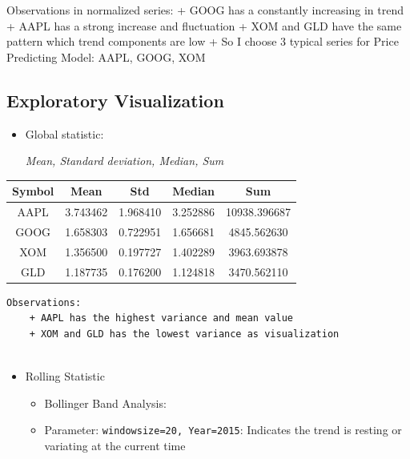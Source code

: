 \documentclass[11pt]{article}
\providecommand{\tightlist}{%
      \setlength{\itemsep}{0pt}\setlength{\parskip}{0pt}}
\begin{document}
Observations in normalized series: + GOOG has a constantly increasing in
trend + AAPL has a strong increase and fluctuation + XOM and GLD have
the same pattern which trend components are low + So I choose 3 typical
series for Price Predicting Model: AAPL, GOOG, XOM

\subsection{Exploratory Visualization}\label{exploratory-visualization}

\begin{itemize}
\item
  Global statistic:

  \emph{Mean, Standard deviation, Median, Sum}
\end{itemize}

\begin{longtable}[]{@{}ccccc@{}}
\toprule
\textbf{Symbol} & \textbf{Mean} & \textbf{Std} & \textbf{Median} &
\textbf{Sum}\tabularnewline
\midrule
\endhead
AAPL & 3.743462 & 1.968410 & 3.252886 & 10938.396687\tabularnewline
GOOG & 1.658303 & 0.722951 & 1.656681 & 4845.562630\tabularnewline
XOM & 1.356500 & 0.197727 & 1.402289 & 3963.693878\tabularnewline
GLD & 1.187735 & 0.176200 & 1.124818 & 3470.562110\tabularnewline
\bottomrule
\end{longtable}

\begin{verbatim}
Observations:
    + AAPL has the highest variance and mean value
    + XOM and GLD has the lowest variance as visualization
    
\end{verbatim}

\begin{itemize}
\tightlist
\item
  Rolling Statistic

  \begin{itemize}
  \tightlist
  \item
    Bollinger Band Analysis:
  \item
    Parameter: \texttt{windowsize=20,\ Year=2015}: Indicates the trend
    is resting or variating at the current time
  \end{itemize}
\end{itemize}
\end{document}
